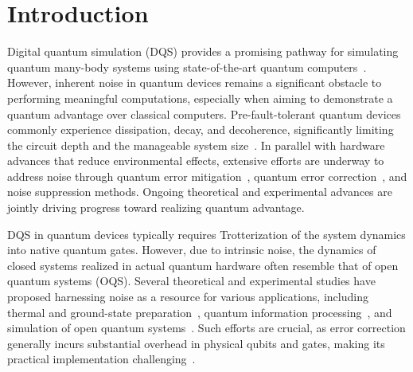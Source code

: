 \documentclass[10pt, superscriptaddress,aps,pra,twocolumn,showpacs,nofootinbib, longbibliography, notitlepage,floatfix]{revtex4-2}
\begin{document}
\section*{Introduction}
Digital quantum simulation (DQS) provides a promising pathway for simulating quantum many-body systems using state-of-the-art quantum computers~\cite{Arute2019, Pan_PRL_2021}. However, inherent noise in quantum devices remains a significant obstacle to performing meaningful computations, especially when aiming to demonstrate a quantum advantage over classical computers. Pre-fault-tolerant quantum devices commonly experience dissipation, decay, and decoherence, significantly limiting the circuit depth and the manageable system size~\cite{Bharti_RevModPhys_2022}. In parallel with hardware advances that reduce environmental effects, extensive efforts are underway to address noise through quantum error mitigation~\cite{Cai_QEM_2023}, quantum error correction~\cite{PhysRevA_surface_code}, and noise suppression methods. Ongoing theoretical and experimental advances are jointly driving progress toward realizing quantum advantage.

DQS in quantum devices typically requires Trotterization of the system dynamics into native quantum gates. However, due to intrinsic noise, the dynamics of closed systems realized in actual quantum hardware often resemble that of open quantum systems (OQS). Several theoretical and experimental studies have proposed harnessing noise as a resource for various applications, including thermal and ground-state preparation~\cite{Terhal_pra_2000, kraus_pra_2008, Verstraete2009, Kapit_2017, science_dissipation}, quantum information processing~\cite{Harrington2022_nat_phys}, and simulation of open quantum systems~\cite{PhysRevA.108.062424, Pleino_PRX_2023}. Such efforts are crucial, as error correction generally incurs substantial overhead in physical qubits and gates, making its practical implementation challenging~\cite{PhysRevA_surface_code}.
\end{document}

